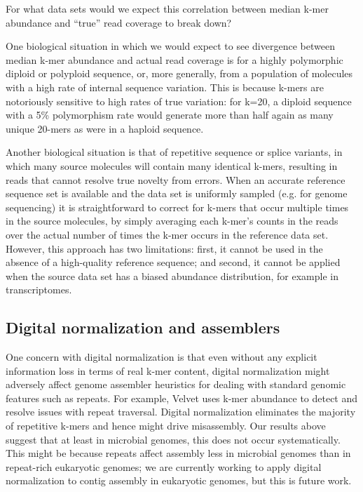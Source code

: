 \documentclass[10pt]{article}
\begin{document}
For what data sets would we expect this correlation between median
k-mer abundance and ``true'' read coverage to break down?

One biological situation in which we would expect to see divergence
between median k-mer abundance and actual read coverage is for a
highly polymorphic diploid or polyploid sequence, or, more generally,
from a population of molecules with a high rate of internal sequence
variation.  This is because k-mers are notoriously sensitive to high
rates of true variation: for k=20, a diploid sequence with a 5\%
polymorphism rate would generate more than half again as many unique
20-mers as were in a haploid sequence.

Another biological situation is that of repetitive sequence or splice
variants, in which many source molecules will contain many identical
k-mers, resulting in reads that cannot resolve true novelty from errors.  When an accurate reference sequence set is available and the
data set is uniformly sampled (e.g. for genome sequencing) it is
straightforward to correct for k-mers that occur multiple times in the
source molecules, by simply averaging each k-mer's counts in the reads
over the actual number of times the k-mer occurs in the reference data
set.  However, this approach has two limitations: first, it cannot be
used in the absence of a high-quality reference sequence; and second,
it cannot be applied when the source data set has a biased abundance
distribution, for example in transcriptomes.

\subsection*{Digital normalization and assemblers}

One concern with digital normalization is that even without any
explicit information loss in terms of real k-mer content, digital
normalization might adversely affect genome assembler heuristics for
dealing with standard genomic features such as repeats.  For example,
Velvet uses k-mer abundance to detect and resolve issues with repeat
traversal.  Digital normalization eliminates the majority of
repetitive k-mers and hence might drive misassembly. Our results above
suggest that at least in microbial genomes, this does not occur
systematically.  This might be because repeats affect assembly less in
microbial genomes than in repeat-rich eukaryotic genomes; we are
currently working to apply digital normalization to contig assembly in
eukaryotic genomes, but this is future work.
\end{document}
